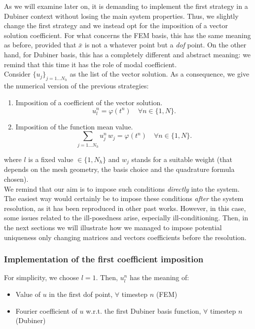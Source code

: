 \documentclass[a4paper,11pt]{article}
\begin{document}
\noindent As we will examine later on, it is demanding to implement the first strategy in a Dubiner context without losing the main system properties. Thus, we slightly change the first strategy and we instead opt for the imposition of a vector solution coefficient. For what concerns the FEM basis, this has the same meaning as before, provided that $\bar{x}$ is not a whatever point but a \emph{dof} point. On the other hand, for Dubiner basis, this has a completely different and abstract meaning: we remind that this time it has the role of modal coefficient. \\

\noindent Consider $\{u_j\}_{j=1 \dots N_h}$ as the list of the vector solution. As a consequence, we give the numerical version of the previous strategies:
\begin{enumerate}
	\item Imposition of a coefficient of the vector solution.
	\begin{equation*}
	u_l^n = \varphi(t^n) \quad \forall n \in \{1,N\}.
	\end{equation*}
	\item Imposition of the function mean value.
	\begin{equation*}
	\sum_{j=1\dots N_h} u_j^n \, w_j = \varphi(t^n)\quad \forall n \in \{1,N\}.
	\end{equation*}
\end{enumerate}	
where $l$ is a fixed value $\in \{1,N_h\}$ and $w_j$ stands for a suitable weight (that depends on the mesh geometry, the basis choice and the quadrature formula chosen). \\

\noindent We remind that our aim is to impose such conditions \emph{directly} into the system. The easiest way would certainly be to impose these conditions \emph{after} the system resolution, as it has been reproduced in other past works. However, in this case, some issues related to the ill-posedness arise, especially ill-conditioning. Then, in the next sections we will illustrate how we managed to impose potential uniqueness only changing matrices and vectors coefficients before the resolution.

\subsubsection{Implementation of the first coefficient imposition} \label{first_coeff_implementation}
For simplicity, we choose $l=1$. Then, $u_l^n$ has the meaning of:
\begin{itemize}
	\item Value of $u$ in the first dof point, $\forall$ timestep $n$ (FEM)
	\item Fourier coefficient of $u$ w.r.t. the first Dubiner basis function, $\forall$ timestep $n$ (Dubiner)
\end{itemize}
\end{document}
